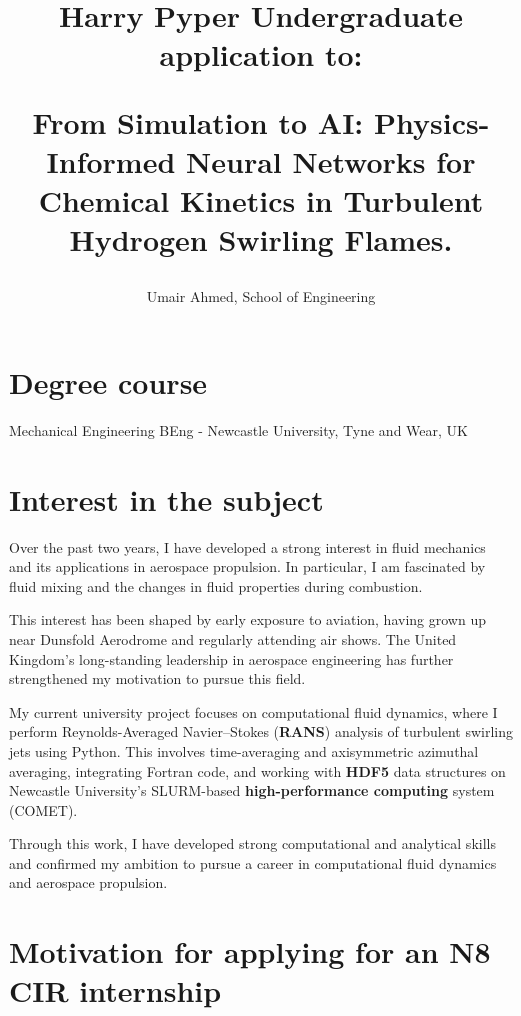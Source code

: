 \documentclass[../main.tex]{subfiles}
\begin{document}
\title{\textbf{Harry Pyper Undergraduate application to:}\par From Simulation to AI: Physics-Informed Neural Networks for Chemical Kinetics in Turbulent Hydrogen Swirling Flames.}
\author{Umair Ahmed, School of Engineering}
\date{}
\maketitle
\setlength{\parskip}{1em}
\linespread{1.66}
\justifying
\section*{Degree course}

Mechanical Engineering BEng - Newcastle University, Tyne and Wear, UK

\section*{Interest in the subject}

Over the past two years, I have developed a strong interest in fluid mechanics and its applications in aerospace propulsion. In particular, I am fascinated by fluid mixing and the changes in fluid properties during combustion.\par

This interest has been shaped by early exposure to aviation, having grown up near Dunsfold Aerodrome and regularly attending air shows. The United Kingdom’s long-standing leadership in aerospace engineering has further strengthened my motivation to pursue this field.\par

My current university project focuses on computational fluid dynamics, where I perform Reynolds-Averaged Navier–Stokes (\textbf{RANS}) analysis of turbulent swirling jets using Python. This involves time-averaging and axisymmetric azimuthal averaging, integrating Fortran code, and working with \textbf{HDF5} data structures on Newcastle University’s SLURM-based \textbf{high-performance computing} system (COMET).\par

Through this work, I have developed strong computational and analytical skills and confirmed my ambition to pursue a career in computational fluid dynamics and aerospace propulsion.\par

\section*{Motivation for applying for an N8 CIR internship}
\end{document}
